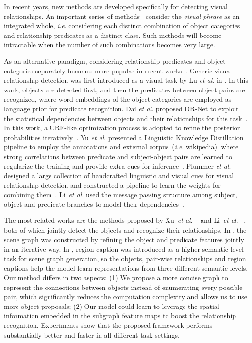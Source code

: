 \documentclass[runningheads]{llncs}
\newcommand{\etal}{\textit{et al}. }
\newcommand{\ie}{\textit{i}.\textit{e}. }
\begin{document}
In recent years, new methods are developed specifically for detecting visual relationships. 
An important series of methods~\cite{das2013thousand, divvala2014learning, sadeghi2011recognition}
consider the \emph{visual phrase} as an integrated whole, \ie considering each distinct combination of object categories and relationship predicates as
a distinct class. 
Such methods will become intractable when the number of such combinations becomes very large. 

As an alternative paradigm, considering relationship predicates and object categories separately becomes more popular in recent works~\cite{liao2017natural,peyre2017weakly,zhang2017visual,zhuang2017towards}. 
Generic visual relationship detection was first introduced as a visual task by Lu \etal in \cite{visual_relationship}. In this work, objects are detected first, and then the predicates between object pairs are recognized, where word embeddings of the object categories are employed as language prior for predicate recognition. 
Dai \etal proposed DR-Net to exploit the statistical dependencies between objects and their relationships for this task~\cite{dai2017detecting}. In this work, a CRF-like optimization process is adopted to refine the posterior probabilities iteratively~\cite{dai2017detecting}. 
Yu \etal presented a Linguistic Knowledge Distillation pipeline to employ the annotations and external corpus~(\ie wikipedia), where strong correlations between predicate and subject-object pairs are learned to regularize the training and provide extra cues for inference~\cite{yu2017visual}. 
Plummer \etal designed a large collection of handcrafted linguistic and visual cues for visual relationship detection and constructed a pipeline to learn the weights for combining them~\cite{plummer2016phrase}.
Li~\etal used the message passing structure among subject, object and predicate branches to model their dependencies~\cite{li2017vip}. 

The most related works are the methods proposed by Xu~\etal~\cite{xu2017scene} and Li~\etal~\cite{li2017scene}, both of which jointly detect the objects and recognize their relationships.  
In \cite{xu2017scene}, the scene graph was constructed by refining the object and predicate features jointly in an iterative way. In \cite{li2017scene}, region caption was introduced as a higher-semantic-level task for scene graph generation, so the objects, pair-wise relationships and region captions help the model learn representations from three different semantic levels. 
Our method differs in two aspects:
(1) We propose a more concise graph to represent the connections between objects instead of enumerating every possible pair, which significantly reduces the computation complexity and allows us to use more object proposals; 
(2) Our model could learn to leverage the spatial information embedded in the subgraph feature maps to boost the relationship recognition.  
Experiments show that the proposed framework performs substantially better and faster in 
all different task settings. 
\end{document}
